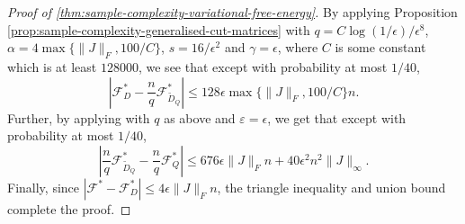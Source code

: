 \documentclass[final, 12pt]{colt2018}
\newcommand{\F}{\mathcal{F}}
\theoremstyle{definition}
\theoremstyle{plain}
\begin{document}
\begin{comment}
Thus, if $Q$ is a random subset of
$V$  of size $q\geq2^{17}/\epsilon'^{6}$, and $J'_Q$ and $D'_Q$ denote the matrices induced on $Q\times Q$ by $J'$ and $D'$ respectively, it follows that with probability at least $39/40$, $B':=J'_Q - D'_Q$ satisfies 
\begin{align*}
\frac{q}{n}\|B'\|_{C} & \leq\frac{q^{2}}{n^{2}}\epsilon n\|J\|_{2}+10\epsilon'^{2}q^{2}\left(\|J\|_{\infty}+\frac{\sqrt{16s}\|J\|_{2}}{n}\right)+5\epsilon'q^{2}\frac{\|J\|_{2}}{n}\\
 & \leq\epsilon\frac{q^{2}}{n^{2}}\frac{\|J\|_{1}}{\sqrt{\Delta}}+10\epsilon'^{2}q^{2}\left(\frac{\|J\|_{1}}{\Delta n^{2}}+\sqrt{16s}\frac{\|J\|_{1}}{n^{2}\sqrt{\Delta}}\right)+5\epsilon'q^{2}\frac{\|J\|_{1}}{n^{2}\sqrt{\Delta}}\\
 & =\frac{q^{2}}{n^{2}}\frac{\|J\|_{1}}{\sqrt{\Delta}}\left(\epsilon+\frac{10\epsilon'^{2}}{\Delta}+\frac{\epsilon'^{2}\sqrt{16s}}{\sqrt{\Delta}}+\frac{5\epsilon'}{\sqrt{\Delta}}\right)\\
 & \leq\frac{q^{2}}{n^{2}}\frac{\|J\|_{1}}{\sqrt{\Delta}}\left(\epsilon+\frac{10\epsilon'^{2}}{\Delta}+\frac{16\epsilon'^{2}}{\epsilon\sqrt{\Delta}}+\frac{5\epsilon'}{\sqrt{\Delta}}\right),
\end{align*}
so that choosing $\epsilon'=\epsilon\sqrt{\Delta}$, we get $\|B'\|_{C}\leq 32\epsilon q \|J\|_{1}/n\sqrt{\Delta}$. In particular, it follows from \cref{lemma: free-energy-lipschitz} that $|\log Z_{J'_Q} - \log Z_{D'_Q}|\leq 128\epsilon q \|J\|_{1}/n\sqrt{\Delta}$ with probability at least $39/40$.
\end{comment}

\begin{proof}[Proof of \cref{thm:sample-complexity-variational-free-energy}]
By applying Proposition \ref{prop:sample-complexity-generalised-cut-matrices} with $q = C\log(1/\epsilon)/\epsilon^{8}$, $\alpha = 4\max\{\|J\|_{F},100/C\}$, $s = 16/\epsilon^2$ and $\gamma = \epsilon$, where $C$ is some constant which is at least $128000$, we see that except with probability at most $1/40$, $$\left| \F^*_D - \frac{n}{q}\F^*_{\tilde{D}_Q}\right| \leq 128 \epsilon \max\{\|J\|_{F},100/C\}n.$$
Further, by applying  with $q$ as above and $\varepsilon = \epsilon$, we get that except with probability at most $1/40$, 
$$\left|\frac{n}{q}\F^*_{\tilde{D}_Q} - \frac{n}{q}\F^*_{Q}\right| \leq 676 \epsilon \|J\|_{F} n + 40 \epsilon^{2} n^2 \|J\|_{\infty}.$$
Finally, since $\left|\F^* - \F^*_{D} \right| \leq 4\epsilon \|J\|_{F} n $, the triangle inequality and union bound complete the proof. 
\end{proof}
\end{document}
